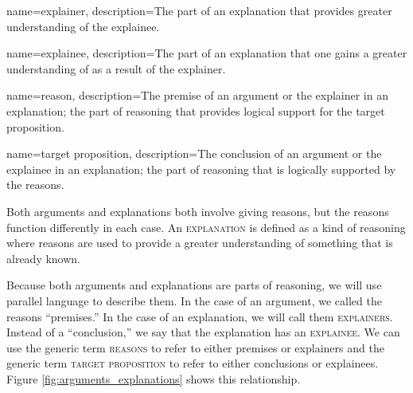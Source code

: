 {
name=explainer,
description={The part of an explanation that provides greater understanding of the explainee.}
}

{
name=explainee,
description={The part of an explanation that one gains a greater understanding of as a result of the explainer.}
}

{
name=reason,
description={The premise of an argument or the explainer in an explanation; the part of reasoning that provides logical support for the target proposition.}
}

{
name=target proposition,
description={The conclusion of an argument or the explainee in an explanation; the part of reasoning that is logically supported by the reasons.}
}



Both arguments and explanations both involve giving reasons, but the reasons function differently in each case. An \textsc{\gls{explanation}} \label{def:explanation}is defined as a kind of reasoning where reasons are used to provide a greater understanding of something that is already known.  

Because both arguments and explanations are parts of reasoning, we will use parallel language to describe them. In the case of an argument, we called the reasons ``premises.'' In the case of an explanation, we will call them \textsc{\glspl{explainer}}. \label{def:explainer} Instead of a ``conclusion,'' we say that the explanation has an \textsc{\gls{explainee}}.  \label{def:explainee} We can use the generic term \textsc{\glspl{reason}} \label{def:reason} to refer to either premises or explainers and the generic term \textsc{\gls{target proposition}} \label{def:target_proposition} to refer to either conclusions or explainees. Figure \ref{fig:arguments_explanations} shows this relationship. 


